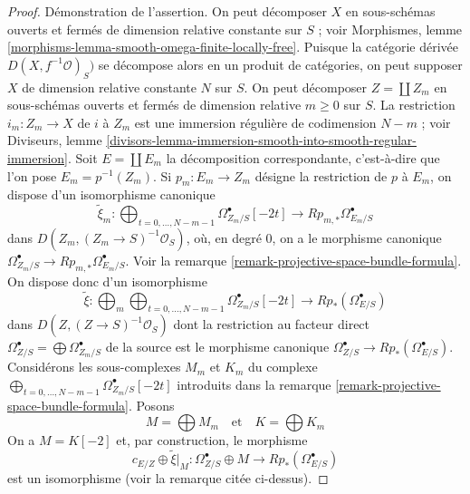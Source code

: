 \begin{proof}
\medskip\noindent
Démonstration de l'assertion. On peut décomposer $X$ en sous-schémas ouverts et fermés
de dimension relative constante sur $S$ ; voir
Morphismes, lemme \ref{morphisms-lemma-smooth-omega-finite-locally-free}.
Puisque la catégorie dérivée $D(X, f^{-1}\mathcal{O})_S)$ se décompose alors
en un produit de catégories, on peut supposer $X$ de
dimension relative constante $N$ sur $S$. On peut décomposer
$Z = \coprod Z_m$ en sous-schémas ouverts et fermés de dimension
relative $m \geq 0$ sur $S$. La restriction $i_m : Z_m \to X$ de
$i$ à $Z_m$ est une immersion régulière de codimension $N - m$ ; voir Diviseurs, lemme
\ref{divisors-lemma-immersion-smooth-into-smooth-regular-immersion}.
Soit $E = \coprod E_m$ la décomposition correspondante, c'est-à-dire
que l'on pose $E_m = p^{-1}(Z_m)$. Si $p_m : E_m \to Z_m$ désigne la
restriction de $p$ à $E_m$, on dispose d'un isomorphisme canonique
$$
\tilde \xi_m :
\bigoplus\nolimits_{t = 0, \ldots, N - m - 1}
\Omega^\bullet_{Z_m/S}[-2t]
\longrightarrow
Rp_{m, *}\Omega^\bullet_{E_m/S}
$$
dans $D(Z_m, (Z_m \to S)^{-1}\mathcal{O}_S)$,
où, en degré $0$, on a le morphisme canonique
$\Omega^\bullet_{Z_m/S} \to Rp_{m, *}\Omega^\bullet_{E_m/S}$.
Voir la remarque \ref{remark-projective-space-bundle-formula}.
On dispose donc d'un isomorphisme
$$
\tilde \xi :
\bigoplus\nolimits_m
\bigoplus\nolimits_{t = 0, \ldots, N - m - 1}
\Omega^\bullet_{Z_m/S}[-2t]
\longrightarrow
Rp_*(\Omega^\bullet_{E/S})
$$
dans $D(Z, (Z \to S)^{-1}\mathcal{O}_S)$
dont la restriction au facteur direct
$\Omega^\bullet_{Z/S} = \bigoplus \Omega^\bullet_{Z_m/S}$ de la source
est le morphisme canonique $\Omega^\bullet_{Z/S} \to Rp_*(\Omega^\bullet_{E/S})$.
Considérons les sous-complexes $M_m$ et $K_m$ du complexe
$\bigoplus\nolimits_{t = 0, \ldots, N - m - 1} \Omega^\bullet_{Z_m/S}[-2t]$
introduits dans la remarque \ref{remark-projective-space-bundle-formula}.
Posons
$$
M = \bigoplus M_m
\quad\text{et}\quad
K = \bigoplus K_m
$$
On a $M = K[-2]$ et, par construction, le morphisme
$$
c_{E/Z} \oplus \tilde \xi|_M :
\Omega^\bullet_{Z/S} \oplus M
\longrightarrow
Rp_*(\Omega^\bullet_{E/S})
$$
est un isomorphisme (voir la remarque citée ci-dessus).


\end{proof}
